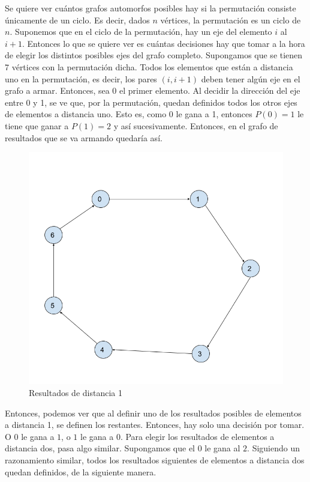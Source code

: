 Se quiere ver cuántos grafos automorfos posibles hay si la permutación consiste únicamente de un ciclo. Es decir, dados $n$ vértices, la permutación es un ciclo de $n$. Suponemos que en el ciclo de la permutación, hay un eje del elemento $i$ al $i+1$. Entonces lo que se quiere ver es cuántas decisiones hay que tomar a la hora de elegir los distintos posibles ejes del grafo completo. Supongamos que se tienen 7 vértices con la permutación dicha. Todos los elementos que están a distancia uno en la permutación, es decir, los pares $(i,i+1)$ deben tener algún eje en el grafo a armar. Entonces, sea 0 el primer elemento. Al decidir la dirección del eje entre 0 y 1, se ve que, por la permutación, quedan definidos todos los otros ejes de elementos a distancia uno. Esto es, como 0 le gana a 1, entonces $P(0)=1$ le tiene que ganar a $P(1)=2$ y así sucesivamente. Entonces, en el grafo de resultados que se va armando quedaría así.

\begin{figure}[H]\centering\includegraphics[scale=0.4]{Imagenes/Ej4a.png}\caption{Resultados de distancia 1}\end{figure}

Entonces, podemos ver que al definir uno de los resultados posibles de elementos a distancia 1, se definen los restantes. Entonces, hay solo una decisión por tomar. O $0$ le gana a $1$, o $1$ le gana a $0$. Para elegir los resultados de elementos a distancia dos, pasa algo similar. Supongamos que el $0$ le gana al $2$. Siguiendo un razonamiento similar, todos los resultados siguientes de elementos a distancia dos quedan definidos, de la siguiente manera.

